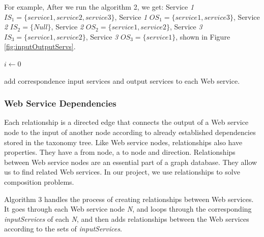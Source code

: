 For example,  After we run the algorithm 2, we get: 
Service \emph{1} $IS_1 = \{service 1, service 2, service 3\}$,
Service \emph{1} $OS_1 = \{service 1, service 3\}$,
Service \emph{2} $IS_2 = \{Null\}$,
Service \emph{2} $OS_2 = \{service 1, service 2\}$,
Service \emph{3} $IS_3 = \{service 1, service 2\}$,
Service \emph{3} $OS_3 = \{service 1\}$, shown in Figure \ref{fig:inputOutputServs}.
\begin{algorithm}[h]
 \LinesNumbered
 \SetNlSty{}{}{:}
 $i \leftarrow 0$\;
 
 \caption{\footnotesize add correspondence input services and output services to each Web service.}
\label{generation}
\end{algorithm}
\setlength{\textfloatsep}{20pt}%

\subsubsection {Web Service Dependencies}
Each relationship is a directed edge that connects the output of a Web service node to the input of another node according to already established dependencies stored in the taxonomy tree. Like Web service nodes, relationships also have properties. They have a from node, a to node and direction. Relationships between Web service nodes are an essential part of a graph database. They allow us to find related Web services. In our project, we use relationships to solve composition problems. \par
Algorithm 3 handles the process of creating relationships between Web services. It goes through each Web service node \emph{N}, and loops through the corresponding \emph{inputServices} of each \emph{N}, and then adds relationships between the Web services according to the sets of \emph{inputServices}.

